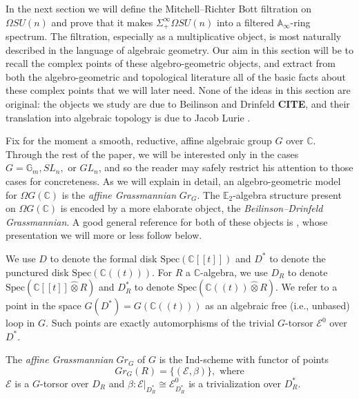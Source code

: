 
In the next section we will define the Mitchell--Richter Bott filtration on $\Omega SU(n)$ and prove that it makes $\Sigma^{\infty}_+ \Omega SU(n)$ into a filtered $\mathbb{A}_\infty$-ring spectrum.  The filtration, especially as a multiplicative object, is most naturally described in the language of algebraic geometry.  Our aim in this section will be to recall the complex points of these algebro-geometric objects, and extract from both the algebro-geometric and topological literature all of the basic facts about these complex points that we will later need.  None of the ideas in this section are original: the objects we study are due to Beilinson and Drinfeld \textbf{CITE}, and their translation into algebraic topology is due to Jacob Lurie  \cite[\S 5.5]{HA}.


Fix for the moment a smooth, reductive, affine algebraic group $G$ over $\mathbb{C}$.  Through the rest of the paper, we will be interested only in the cases $G=\mathbb{G}_m,SL_n,$ or $GL_n$, and so the reader may safely restrict his attention to those cases for concreteness.  As we will explain in detail, an algebro-geometric model for $\Omega G(\mathbb{C})$ is the \textit{affine Grassmannian} $Gr_G$.  The $\mathbb{E}_2$-algebra structure present on $\Omega G(\mathbb{C})$ is encoded by a more elaborate object, the \textit{Beilinson--Drinfeld Grassmannian}.  A good general reference for both of these objects is \cite{Zhu}, whose presentation we will more or less follow below.

We use $D$ to denote the formal disk $\text{Spec}(\mathbb{C}[[t]])$ and $D^*$ to denote the punctured disk $\text{Spec}(\mathbb{C}((t)))$.  For $R$ a $\mathbb{C}$-algebra, we use $D_R$ to denote $\text{Spec}(\mathbb{C}[[t]] \hat{\otimes} R)$ and $D^*_R$ to denote $\text{Spec}(\mathbb{C}((t)) \hat{\otimes} R)$.  We refer to a point in the space $G(D^*)=G(\mathbb{C}((t)))$ as an algebraic free (i.e., unbased) loop in $G$.  Such points are exactly automorphisms of the trivial $G$-torsor $\mathcal{E}^0$ over $D^*$.

\begin{dfn}
The \textit{affine Grassmannian} $Gr_G$ of $G$ is the Ind-scheme with functor of points
$$Gr_G(R) = \{(\mathcal{E},\beta)\},\text{ where}$$
$\mathcal{E}$ is a $G$-torsor over $D_{R}$ and $\beta:\mathcal{E}|_{D^*_{R}} \cong \mathcal{E}^0_{D^*_{R}}$ is a trivialization over $D^*_{R}$.
\end{dfn}

